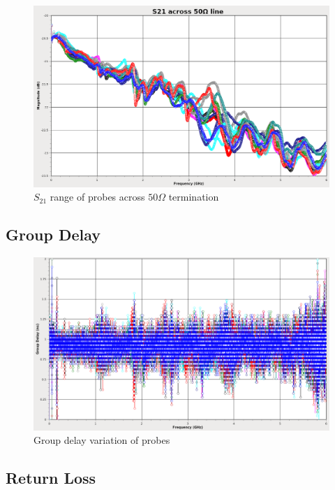 \documentclass[11pt]{article}
\begin{document}
\begin{figure}[h!]
\centering
\includegraphics[width=14cm]{s21-variation.png}
\caption{$S_{21}$ range of probes across $50\Omega$ termination}
\label{s21-variation}
\end{figure}

\subsection{Group Delay}

\begin{figure}[h]
\centering
\includegraphics[width=14cm]{groupdelay-variation.png}
\caption{Group delay variation of probes}
\label{typical-groupdelay}
\end{figure}
\FloatBarrier

\pagebreak
\subsection{Return Loss}
\end{document}
